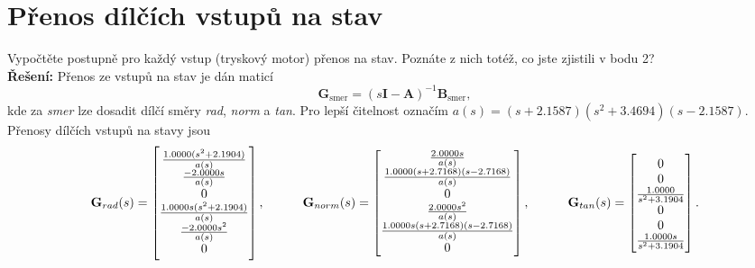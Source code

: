 \documentclass[twoside]{article}
\begin{document}
\section{Přenos dílčích vstupů na stav}
\label{sec:ukol3}
Vypočtěte postupně pro každý vstup (tryskový motor) přenos na stav. Poznáte z nich totéž, co jste zjistili
v bodu 2? \\
\textbf{Řešení:}
Přenos ze vstupů na stav je dán maticí 
\begin{equation*}
	\mathbf{G}_{\text{smer}} = (s\mathbf{I}-\mathbf{A})^{-1} \mathbf{B}_{\text{smer}},
\end{equation*}
kde za \textit{smer} lze dosadit dílčí směry \textit{rad}, \textit{norm} a \textit{tan}.
Pro lepší čitelnost označím $a(s) = (s+2.1587)(s^2+3.4694)(s-2.1587)$. Přenosy dílčích vstupů na stavy jsou
\begin{equation}
	\label{eq:prenosy}
	\mathbf{G}_{rad}(s) = \begin{bmatrix}
		
		\frac{1.0000(s^2+2.1904)     }{a(s)}          \\                
		\frac{-2.0000s        }{a(s)}                   \\               
		0                                    \\            
		\frac{1.0000s(s^2+2.1904)}{a(s)}              \\
		\frac{-2.0000s^2}{a(s)}                         \\               
		0                                                
	\end{bmatrix}, ~~~~~~~~~                                                    
		\mathbf{G}_{norm}(s) =                       
		\begin{bmatrix}
			
			\frac{2.0000s}{a(s)}                                               \\
			\frac{1.0000(s+2.7168)(s-2.7168) }{a(s)}                \\           
			0                                        \\             
			\frac{2.0000s^2                  }{a(s)}           \\
			\frac{1.0000s(s+2.7168)(s-2.7168)}{a(s)}             \\              
			0                                                     
		\end{bmatrix}, ~~~~~~~~~
		\mathbf{G}_{tan}(s) = \begin{bmatrix}
			
			0                              \\   
			0                             \\    
			\frac{1.0000}{s^2+3.1904}     \\       
			0                              \\
			0                               \\   
			\frac{1.0000s}{s^2+3.1904}                           
		\end{bmatrix}.
\end{equation}
\end{document}
